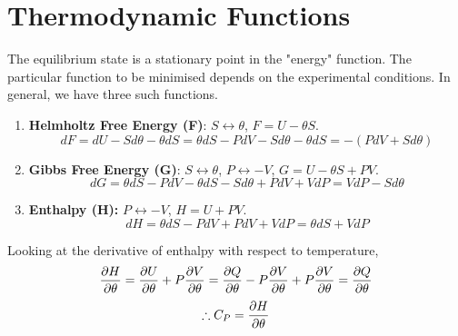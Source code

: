 \section{Thermodynamic Functions}
\label{sec:1.4thermodynamicfunctions}
        The equilibrium state is a stationary point in the "energy" function. The particular function to be minimised depends on the experimental conditions. In general, we have three such functions.
        \begin{enumerate}
            \item \textbf{Helmholtz Free Energy (F)}: $S\longleftrightarrow \theta$, $F=U-\theta S$.
            \begin{equation}
                dF = dU -Sd\theta-\theta dS = \theta dS -PdV -Sd\theta-\theta dS=-(PdV+Sd\theta)
            \end{equation}
            \item \textbf{Gibbs Free Energy (G)}: $S\longleftrightarrow \theta$, $P\longleftrightarrow-V$, $G=U-\theta S+PV$.
            \begin{equation}
                dG = \theta dS-PdV-\theta dS-Sd\theta+PdV+VdP = VdP-Sd\theta
            \end{equation}
            \item \textbf{Enthalpy (H):} $P\longleftrightarrow-V$, $H=U+PV$.
            \begin{equation}
                dH = \theta dS - PdV + PdV + VdP = \theta dS+VdP
            \end{equation}
        \end{enumerate}
        Looking at the derivative of enthalpy with respect to temperature,
        \begin{equation}
            \frac{\partial H}{\partial \theta} = \frac{\partial U}{\partial \theta} + P\frac{\partial V}{\partial \theta} = \frac{\partial Q}{\partial \theta}-P\frac{\partial V}{\partial \theta}+P\frac{\partial V}{\partial \theta}=\frac{\partial Q}{\partial \theta}
        \end{equation}
        \begin{equation}
            \therefore C_P = \frac{\partial H}{\partial \theta}
        \end{equation}
